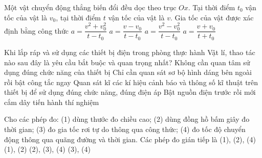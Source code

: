 \begin{ex}
	Một vật chuyển động thẳng biến đổi đều dọc theo trục $Ox$. Tại thời điểm $t_0$ vận tốc của vật là $v_0$, tại thời điểm $t$ vận tốc của vật là $v$. Gia tốc của vật được xác định bằng công thức
	\choice
	{$a = \dfrac{v^2 + v_0^2}{t - t_0}$}
	{\True $a = \dfrac{v - v_0}{t - t_0}$}
	{$a = \dfrac{v^2 - v_0^2}{t - t_0}$}
	{$a = \dfrac{v + v_0}{t + t_0}$}
\end{ex}

\begin{ex}
	Khi lắp ráp và sử dụng các thiết bị điện trong phòng thực hành Vật lí, thao tác nào sau đây là yêu cầu bắt buộc và quan trọng nhất?
	\choice
	{Không cần quan tâm sử dụng đúng chức năng của thiết bị}
	{Chỉ cần quan sát sơ bộ hình dáng bên ngoài rồi bật công tắc ngay}
	{\True Quan sát kĩ các kí hiệu cảnh báo và thông số kĩ thuật trên thiết bị để sử dụng đúng chức năng, đúng điện áp}
	{Bật nguồn điện trước rồi mới cắm dây tiến hành thí nghiệm}
\end{ex}

\begin{ex}
	Cho các phép đo: (1) dùng thước đo chiều cao; (2) dùng đồng hồ bấm giây đo thời gian; (3) đo gia tốc rơi tự do thông qua công thức; (4) đo tốc độ chuyển động thông qua quãng đường và thời gian. Các phép đo gián tiếp là
	\choice
	{(1), (2), (4)}
	{(1), (2)}
	{(2), (3), (4)}
	{\True (3), (4)}
\end{ex}

